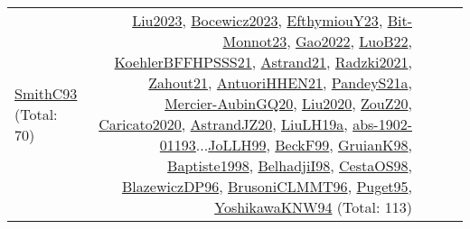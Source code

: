 {\begin{longtable}{p{3cm}r>{\raggedright\arraybackslash}p{6cm}>{\raggedright\arraybackslash}p{6cm}>{\raggedright\arraybackslash}p{8cm}}
\hyperref[detail:SmithC93]{SmithC93} (Total: 70) & \hyperref[detail:Liu2023]{Liu2023}, \hyperref[detail:Bocewicz2023]{Bocewicz2023}, \hyperref[detail:EfthymiouY23]{EfthymiouY23}, \hyperref[detail:Bit-Monnot23]{Bit-Monnot23}, \hyperref[detail:Gao2022]{Gao2022}, \hyperref[detail:LuoB22]{LuoB22}, \hyperref[detail:KoehlerBFFHPSSS21]{KoehlerBFFHPSSS21}, \hyperref[detail:Astrand21]{Astrand21}, \hyperref[detail:Radzki2021]{Radzki2021}, \hyperref[detail:Zahout21]{Zahout21}, \hyperref[detail:AntuoriHHEN21]{AntuoriHHEN21}, \hyperref[detail:PandeyS21a]{PandeyS21a}, \hyperref[detail:Mercier-AubinGQ20]{Mercier-AubinGQ20}, \hyperref[detail:Liu2020]{Liu2020}, \hyperref[detail:ZouZ20]{ZouZ20}, \hyperref[detail:Caricato2020]{Caricato2020}, \hyperref[detail:AstrandJZ20]{AstrandJZ20}, \hyperref[detail:LiuLH19a]{LiuLH19a}, \hyperref[detail:abs-1902-01193]{abs-1902-01193}...\hyperref[detail:JoLLH99]{JoLLH99}, \hyperref[detail:BeckF99]{BeckF99}, \hyperref[detail:GruianK98]{GruianK98}, \hyperref[detail:Baptiste1998]{Baptiste1998}, \hyperref[detail:BelhadjiI98]{BelhadjiI98}, \hyperref[detail:CestaOS98]{CestaOS98}, \hyperref[detail:BlazewiczDP96]{BlazewiczDP96}, \hyperref[detail:BrusoniCLMMT96]{BrusoniCLMMT96}, \hyperref[detail:Puget95]{Puget95}, \hyperref[detail:YoshikawaKNW94]{YoshikawaKNW94} (Total: 113)\\

\end{longtable}}
